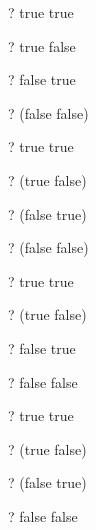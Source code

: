 \documentclass{article}
\begin{document}
\begin{zed} \vdash?  true \lor true \end{zed}
\begin{zed} \vdash?  true \lor false \end{zed}
\begin{zed} \vdash?  false \lor true \end{zed}
\begin{zed} \vdash?  \lnot(false \lor false) \end{zed}

\begin{zed} \vdash?  true \land true \end{zed}
\begin{zed} \vdash?  \lnot(true \land false) \end{zed}
\begin{zed} \vdash?  \lnot(false \land true) \end{zed}
\begin{zed} \vdash?  \lnot(false \land false) \end{zed}

\begin{zed} \vdash?  true \implies true \end{zed}
\begin{zed} \vdash?  \lnot(true \implies false) \end{zed}
\begin{zed} \vdash?  false \implies true \end{zed}
\begin{zed} \vdash?  false \implies false \end{zed}

\begin{zed} \vdash?  true \iff true \end{zed}
\begin{zed} \vdash?  \lnot(true \iff false) \end{zed}
\begin{zed} \vdash?  \lnot(false \iff true) \end{zed}
\begin{zed} \vdash?  false \iff false \end{zed}
\end{document}
